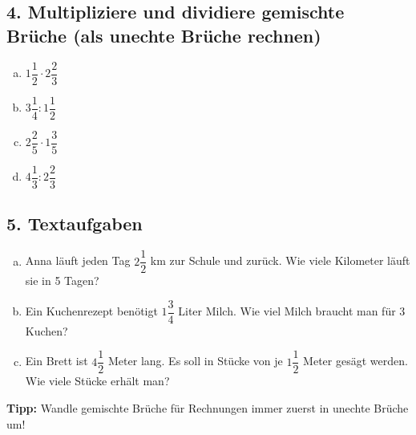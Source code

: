 \subsection*{4. Multipliziere und dividiere gemischte Brüche (als unechte Brüche rechnen)}
\begin{enumerate}[a)]
    \item $1\dfrac{1}{2} \cdot 2\dfrac{2}{3}$
    \item $3\dfrac{1}{4} : 1\dfrac{1}{2}$
    \item $2\dfrac{2}{5} \cdot 1\dfrac{3}{5}$
    \item $4\dfrac{1}{3} : 2\dfrac{2}{3}$
\end{enumerate}

\subsection*{5. Textaufgaben}
\begin{enumerate}[a)]
    \item Anna läuft jeden Tag $2\dfrac{1}{2}$ km zur Schule und zurück. Wie viele Kilometer läuft sie in 5 Tagen?
    \item Ein Kuchenrezept benötigt $1\dfrac{3}{4}$ Liter Milch. Wie viel Milch braucht man für 3 Kuchen?
    \item Ein Brett ist $4\dfrac{1}{2}$ Meter lang. Es soll in Stücke von je $1\dfrac{1}{2}$ Meter gesägt werden. Wie viele Stücke erhält man?
\end{enumerate}

\vspace{1em}
\textbf{Tipp:} Wandle gemischte Brüche für Rechnungen immer zuerst in unechte Brüche um!